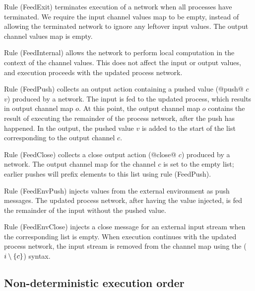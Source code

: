Rule (FeedExit) terminates execution of a network when all processes have terminated.
We require the input channel values map to be empty, instead of allowing the terminated network to ignore any leftover input values.
The output channel values map is empty.

Rule (FeedInternal) allows the network to perform local computation in the context of the channel values.
This does not affect the input or output values, and execution proceeds with the updated process network.

Rule (FeedPush) collects an output action containing a pushed value (@push@ $c$ $v$) produced by a network.
The input is fed to the updated process, which results in output channel map $o$.
At this point, the output channel map $o$ contains the result of executing the remainder of the process network, after the push has happened.
In the output, the pushed value $v$ is added to the start of the list corresponding to the output channel $c$.

Rule (FeedClose) collects a close output action (@close@ $c$) produced by a network.
The output channel map for the channel $c$ is set to the empty list; earlier pushes will prefix elements to this list using rule (FeedPush).

Rule (FeedEnvPush) injects values from the external environment as push messages.
The updated process network, after having the value injected, is fed the remainder of the input without the pushed value.

Rule (FeedEnvClose) injects a close message for an external input stream when the corresponding list is empty.
When execution continues with the updated process network, the input stream is removed from the channel map using the ($i \setminus \{ c \}$) syntax.



\subsection{Non-deterministic execution order}
\label{s:EvaluationOrder}


